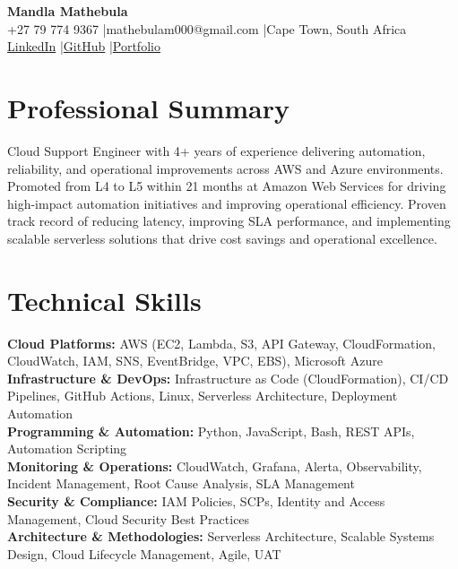 \documentclass[11pt,a4paper]{article}
\begin{document}
\begin{center}
{\LARGE\bfseries Mandla Mathebula}\\[3pt]
+27 79 774 9367 \enspace|\enspace mathebulam000@gmail.com \enspace|\enspace Cape Town, South Africa\\[2pt]
\href{https://linkedin.com/in/mandla-mathebula-4258a518a}{\color{linkblue}LinkedIn} \enspace|\enspace \href{https://github.com/mamathebula}{\color{linkblue}GitHub} \enspace|\enspace \href{https://applyza.co.za/resume_mandla/}{\color{linkblue}Portfolio}
\end{center}

\section{Professional Summary}
Cloud Support Engineer with 4+ years of experience delivering automation, reliability, and operational improvements across AWS and Azure environments. Promoted from L4 to L5 within 21 months at Amazon Web Services for driving high-impact automation initiatives and improving operational efficiency. Proven track record of reducing latency, improving SLA performance, and implementing scalable serverless solutions that drive cost savings and operational excellence.

\section{Technical Skills}
\textbf{Cloud Platforms:} AWS (EC2, Lambda, S3, API Gateway, CloudFormation, CloudWatch, IAM, SNS, EventBridge, VPC, EBS), Microsoft Azure\\
\textbf{Infrastructure \& DevOps:} Infrastructure as Code (CloudFormation), CI/CD Pipelines, GitHub Actions, Linux, Serverless Architecture, Deployment Automation\\
\textbf{Programming \& Automation:} Python, JavaScript, Bash, REST APIs, Automation Scripting\\
\textbf{Monitoring \& Operations:} CloudWatch, Grafana, Alerta, Observability, Incident Management, Root Cause Analysis, SLA Management\\
\textbf{Security \& Compliance:} IAM Policies, SCPs, Identity and Access Management, Cloud Security Best Practices\\
\textbf{Architecture \& Methodologies:} Serverless Architecture, Scalable Systems Design, Cloud Lifecycle Management, Agile, UAT

\end{document}
